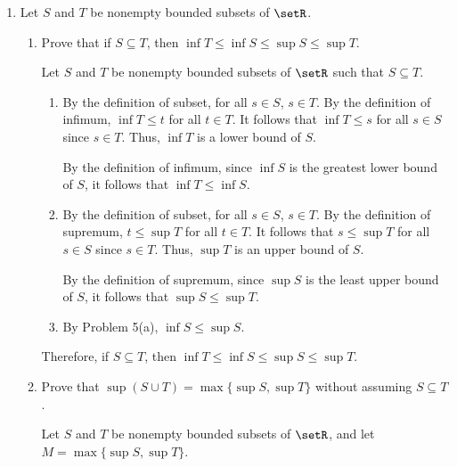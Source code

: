 \begin{enumerate}
\begin{enumerate}
\begin{subanswer}
      Let $c = \inf S = \sup S$.
      By definition of infimum, $c \leq s$ for all $s \in S$.
      By definition of supremum, $s \leq c$ for all $s \in S$.
      Thus, $s = c$ for all $s \in S$.
      Since $S$ is nonempty, there exists at least one element in $S$, and since all elements equal $c$, it follows that $S = \{c\}$.
    \end{subanswer}
  \end{enumerate}






  \newpage

  \item Let $S$ and $T$ be nonempty bounded subsets of $\setR$.
  \begin{enumerate}
    \item Prove that if $S \subseteq T$, then $\inf T \leq \inf S \leq \sup S \leq \sup T$.
    \begin{subprove}
      Let $S$ and $T$ be nonempty bounded subsets of $\setR$ such that $S \subseteq T$.
      \begin{enumerate}
        \item 
        By the definition of subset, for all $s \in S$, $s \in T$.
        By the definition of infimum, $\inf T \leq t$ for all $t \in T$.
        It follows that $\inf T \leq s$ for all $s \in S$ since $s \in T$.
        Thus, $\inf T$ is a lower bound of $S$.
  
        By the definition of infimum, since $\inf S$ is the greatest lower bound of $S$, it follows that $\inf T \leq \inf S$.
        \item
        By the definition of subset, for all $s \in S$, $s \in T$.
        By the definition of supremum, $t \leq \sup T$ for all $t \in T$.
        It follows that $s \leq \sup T$ for all $s \in S$ since $s \in T$.
        Thus, $\sup T$ is an upper bound of $S$.
  
        By the definition of supremum, since $\sup S$ is the least upper bound of $S$, it follows that $\sup S \leq \sup T$.
        \item
        By Problem 5(a), $\inf S \leq \sup S$.
      \end{enumerate}
      Therefore, if $S \subseteq T$, then $\inf T \leq \inf S \leq \sup S \leq \sup T$.
    \end{subprove}
    \item Prove that $\sup (S \cup T)=\max \{\sup S, \sup T\}$ without assuming $S \subseteq T$.
    \begin{subprove}
      Let $S$ and $T$ be nonempty bounded subsets of $\setR$, and let $M = \max \{\sup S, \sup T\}$.
      

\end{subprove}
\end{enumerate}
\end{enumerate}

